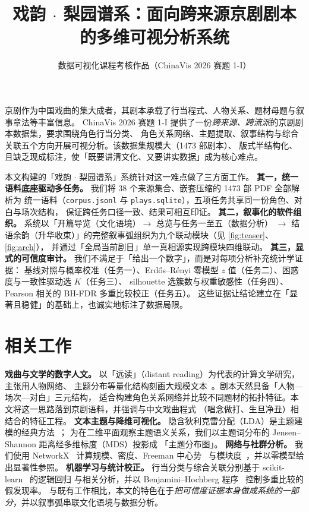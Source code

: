 \documentclass[journal]{vgtc}
\title{戏韵 $\cdot$ 梨园谱系：面向跨来源京剧剧本的多维可视分析系统}
\author{数据可视化课程考核作品（ChinaVis 2026 赛题 1-I）}
\begin{document}
\maketitle

京剧作为中国戏曲的集大成者，其剧本承载了行当程式、人物关系、题材母题与叙事章法等丰富信息。
ChinaVis 2026 赛题 1-I 提供了一份\emph{跨来源、跨流派}的京剧剧本数据集，要求围绕角色行当分类、
角色关系网络、主题提取、叙事结构与综合关联五个方向开展可视分析。该数据集规模大（1473 部剧本）、
版式半结构化、且缺乏现成标注，使「既要讲清文化、又要讲实数据」成为核心难点。

本文构建的「戏韵 $\cdot$ 梨园谱系」系统针对这一难点做了三方面工作。
\textbf{其一，统一语料底座驱动多任务。} 我们将 38 个来源集合、嵌套压缩的 1473 部 PDF 全部解析为
统一语料（\texttt{corpus.jsonl} 与 \texttt{plays.sqlite}），五项任务共享同一份角色、对白与场次结构，
保证跨任务口径一致、结果可相互印证。
\textbf{其二，叙事化的软件组织。} 系统以「开篇导览（文化语境）$\to$ 总览与任务一至五（数据分析）
$\to$ 结语余韵（升华收束）」的完整叙事弧组织为九个联动模块（见 \autoref{fig:teaser}、\autoref{fig:arch}），
并通过「全局当前剧目」单一真相源实现跨模块四维联动。
\textbf{其三，显式的可信度审计。} 我们不满足于「给出一个数字」，而是对每项分析补充统计学证据：
基线对照与概率校准（任务一）、Erdős–Rényi 零模型 $z$ 值（任务二）、困惑度与一致性驱动选 $K$（任务三）、
silhouette 选簇数与权重敏感性（任务四）、Pearson 相关的 BH-FDR 多重比较校正（任务五）。
这些证据让结论建立在「显著且稳健」的基础上，也诚实地标注了数据局限。

\section{相关工作}
\textbf{戏曲与文学的数字人文。} 以「远读」（distant reading）为代表的计算文学研究，主张用人物网络、
主题分布等量化结构刻画大规模文本~\cite{Moretti:2011:NTP}。剧本天然具备「人物—场次—对白」三元结构，
适合构建角色关系网络并比较不同题材的拓扑特征。本文将这一思路落到京剧语料，并强调与中文戏曲程式
（唱念做打、生旦净丑）相结合的特征工程。
\textbf{文本主题与降维可视化。} 隐含狄利克雷分配（LDA）是主题建模的经典方法~\cite{Blei:2003:LDA}；
为在二维平面观察主题语义关系，我们以主题词分布的 Jensen–Shannon 距离经多维标度（MDS）投影成
「主题分布图」。
\textbf{网络与社群分析。} 我们使用 NetworkX~\cite{Hagberg:2008:NX} 计算规模、密度、Freeman 中心势~\cite{Freeman:1978:CSN}
与模块度~\cite{Newman:2006:MCS}，并以零模型给出显著性参照。
\textbf{机器学习与统计校正。} 行当分类与综合关联分别基于 scikit-learn~\cite{Pedregosa:2011:SL} 的逻辑回归
与相关分析，并以 Benjamini–Hochberg 程序~\cite{Benjamini:1995:CFD} 控制多重比较的假发现率。
与既有工作相比，本文的特色在于\emph{把可信度证据本身做成系统的一部分}，并以叙事弧串联文化语境与数据分析。
\end{document}
